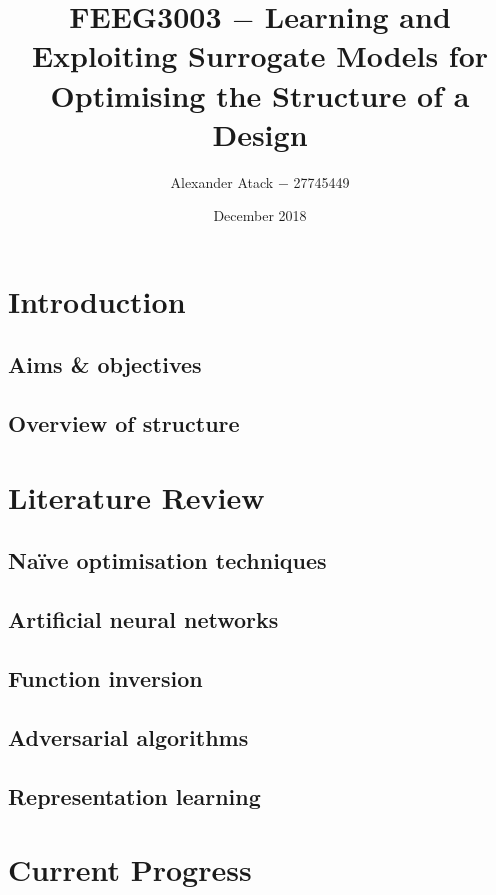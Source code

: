 \documentclass[a4paper,11pt]{article}
\begin{document}
\title{FEEG3003 $-$ Learning and Exploiting Surrogate Models for Optimising the Structure of a Design}
\author{Alexander Atack $-$ 27745449}
\date{December 2018}
\maketitle

\section{Introduction}

\subsection{Aims \& objectives}

\subsection{Overview of structure}

\section{Literature Review}

\subsection{Na\"{i}ve optimisation techniques}

\subsection{Artificial neural networks}

\subsection{Function inversion}

\subsection{Adversarial algorithms}

\subsection{Representation learning}

\section{Current Progress}
\end{document}
